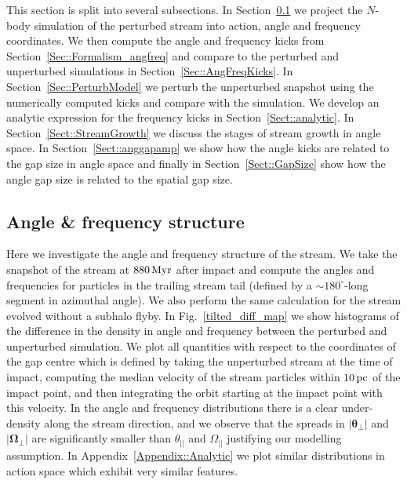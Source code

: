 \documentclass[useAMS,usenatbib,fleqn,a4paper]{mn2e}
\def\pc{\,{\rm pc}}
\def\Myr{\,{\rm Myr}}
\begin{document}
This section is split into several subsections. In Section~\ref{Sec::ActAngFreq} we project the $N$-body simulation of the perturbed stream into action, angle and frequency coordinates. We then compute the angle and frequency kicks from Section~\ref{Sec::Formalism_angfreq} and compare to the perturbed and unperturbed simulations in Section~\ref{Sec::AngFreqKicks}. In Section~\ref{Sec::PerturbModel} we perturb the unperturbed snapshot using the numerically computed kicks and compare with the simulation. We develop an analytic expression for the frequency kicks in Section~\ref{Sect::analytic}. In Section~\ref{Sect::StreamGrowth} we discuss the stages of stream growth in angle space. In Section~\ref{Sect::anggapamp} we show how the angle kicks are related to the gap size in angle space and finally in Section~\ref{Sect::GapSize} show how the angle gap size is related to the spatial gap size.


\subsection{Angle \& frequency structure}\label{Sec::ActAngFreq}
Here we investigate the angle and frequency structure of the stream. We take the snapshot of the stream at $880\Myr$ after impact and compute the angles and frequencies for particles in the trailing stream tail (defined by a $\sim180^\circ$-long segment in azimuthal angle). We also perform the same calculation for the stream evolved without a subhalo flyby. In Fig.~\ref{tilted_diff_map} we show histograms of the difference in the density in angle and frequency between the perturbed and unperturbed simulation. We plot all quantities with respect to the coordinates of the gap centre which is defined by taking the unperturbed stream at the time of impact, computing the median velocity of the stream particles within $10\pc$ of the impact point, and then integrating the orbit starting at the impact point with this velocity. In the angle and frequency distributions there is a clear under-density along the stream direction, and we observe that the spreads in $|\boldsymbol{\theta}_\perp|$ and $|\boldsymbol{\Omega}_\perp|$ are significantly smaller than $\theta_{||}$ and $\Omega_{||}$ justifying our modelling assumption. In Appendix~\ref{Appendix::Analytic} we plot similar distributions in action space which exhibit very similar features.
\end{document}
